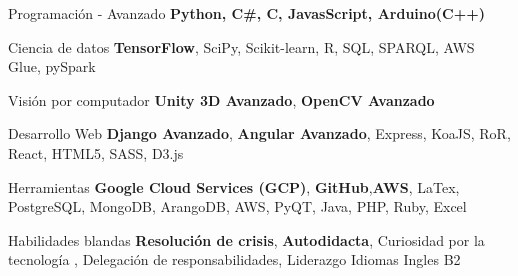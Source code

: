 

\begin{cvskills}

  \cvskill
    {Programación - Avanzado} %
    {\textbf{Python, C\#, C, JavasScript, Arduino(C++)}} %

  \cvskill
    {Ciencia de datos}
    {\textbf{TensorFlow}, SciPy, Scikit-learn, R, SQL, SPARQL, AWS Glue, pySpark}

  \cvskill
    {Visión por computador} %
    {\textbf{Unity 3D Avanzado}, \textbf{OpenCV Avanzado}} %

  \cvskill
    {Desarrollo Web} %
    {\textbf{Django Avanzado}, \textbf{Angular Avanzado}, Express, KoaJS, RoR, React, HTML5, SASS, D3.js} %

  \cvskill
    {Herramientas}
    {\textbf{Google Cloud Services (GCP)}, \textbf{GitHub},\textbf{AWS}, LaTex, PostgreSQL, MongoDB, ArangoDB, AWS, PyQT, Java, PHP, Ruby, Excel}

  \cvskill
    {Habilidades blandas}
    {\textbf{Resolución de crisis}, \textbf{Autodidacta}, Curiosidad por la tecnología , Delegación de responsabilidades, Liderazgo}
  \cvskill
    {Idiomas} %
    {Ingles B2} %

\end{cvskills}
